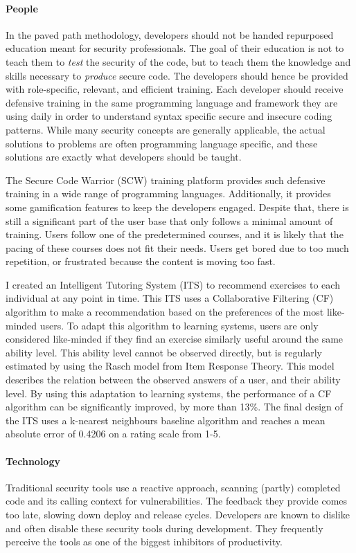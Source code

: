 \paragraph{People}
In the paved path methodology, developers should not be handed repurposed education meant for security professionals.
The goal of their education is not to teach them to \textit{test} the security of the code, but to teach them the knowledge and skills necessary to \textit{produce} secure code.
The developers should hence be provided with role-specific, relevant, and efficient training.
Each developer should receive defensive training in the same programming language and framework they are using daily in order to understand syntax specific secure and insecure coding patterns.
While many security concepts are generally applicable, the actual solutions to problems are often programming language specific, and these solutions are exactly what developers should be taught.

The Secure Code Warrior (SCW) training platform provides such defensive training in a wide range of programming languages.
Additionally, it provides some gamification features to keep the developers engaged.
Despite that, there is still a significant part of the user base that only follows a minimal amount of training.
Users follow one of the predetermined courses, and it is likely that the pacing of these courses does not fit their needs.
Users get bored due to too much repetition, or frustrated because the content is moving too fast.

I created an Intelligent Tutoring System (ITS) to recommend exercises to each individual at any point in time.
This ITS uses a Collaborative Filtering (CF) algorithm to make a recommendation based on the preferences of the most like-minded users.
To adapt this algorithm to learning systems, users are only considered like-minded if they find an exercise similarly useful around the same ability level.
This ability level cannot be observed directly, but is regularly estimated by using the Rasch model from Item Response Theory.
This model describes the relation between the observed answers of a user, and their ability level.
By using this adaptation to learning systems, the performance of a CF algorithm can be significantly improved, by more than 13\%.
The final design of the ITS uses a k-nearest neighbours baseline algorithm and reaches a mean absolute error of 0.4206 on a rating scale from 1-5.

\paragraph{Technology}
Traditional security tools use a reactive approach, scanning (partly) completed code and its calling context for vulnerabilities.
The feedback they provide comes too late, slowing down deploy and release cycles.
Developers are known to dislike and often disable these security tools during development.
They frequently perceive the tools as one of the biggest inhibitors of productivity.

